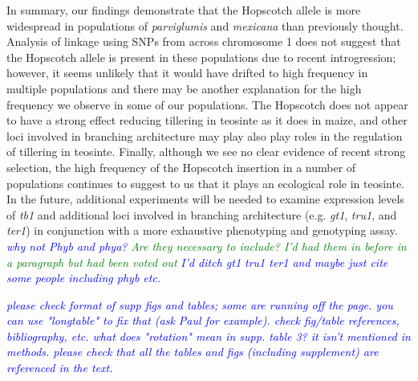 \documentclass[12pt]{article}
\newcommand{\jri}[1]{\textcolor{blue}{ \emph{\scriptsize  #1}} }
\newcommand{\mbh}[1]{\textcolor{red}{ \emph{\scriptsize  #1}} }
\newcommand{\lev}[1]{\textcolor{green}{\emph{\scriptsize #1}} }
\begin{document}
In summary, our findings demonstrate that the Hopscotch allele is more widespread in populations of \emph{parviglumis} and \emph{mexicana} than previously thought. Analysis of linkage using SNPs from across chromosome 1 does not suggest that the Hopscotch allele is present in these populations due to recent introgression; however, it seems unlikely that  it would have drifted to high frequency in multiple populations and there may be another explanation for the high frequency we observe in some of our populations. The Hopscotch does not appear to have a strong effect reducing tillering in teosinte as it does in maize, and  other loci involved in branching architecture  may play also play roles in the regulation of tillering in teosinte. Finally, although we see no clear evidence of recent strong selection, the high frequency of the Hopscotch insertion in a number of populations continues to suggest to us that it plays an ecological role in teosinte. In the future, additional experiments will be needed to examine expression levels of \emph{tb1} and additional loci involved in branching architecture (e.g. \emph{gt1}, \emph{tru1}, and \emph{ter1}) in conjunction with a more exhaustive phenotyping and genotyping assay. \jri{why not Phyb and phya? } \lev{Are they necessary to include? I'd had them in before in a paragraph but had been voted out} \jri{I'd ditch gt1 tru1 ter1 and maybe just cite some people including phyb etc.}

\jri{please check format of supp figs and tables; some are running off the page.  you can use "longtable" to fix that (ask Paul for example). check fig/table references, bibliography, etc. what does "rotation" mean in supp. table 3? it isn't mentioned in methods. please check that all the tables and figs (including supplement) are referenced in the text.}


\end{document}
